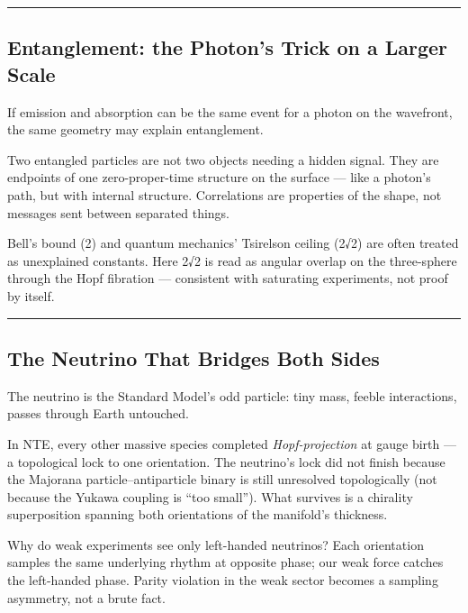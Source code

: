 \documentclass[
  11pt,
]{article}
\begin{document}
\begin{center}\rule{0.5\linewidth}{0.5pt}\end{center}

\subsection{Entanglement: the Photon's Trick on a Larger
Scale}\label{entanglement-the-photons-trick-on-a-larger-scale}

If emission and absorption can be the same event for a photon on the
wavefront, the same geometry may explain entanglement.

Two entangled particles are not two objects needing a hidden signal.
They are endpoints of one zero-proper-time structure on the surface ---
like a photon's path, but with internal structure. Correlations are
properties of the shape, not messages sent between separated things.

Bell's bound (2) and quantum mechanics' Tsirelson ceiling (2√2) are
often treated as unexplained constants. Here 2√2 is read as angular
overlap on the three-sphere through the Hopf fibration --- consistent
with saturating experiments, not proof by itself.

\begin{center}\rule{0.5\linewidth}{0.5pt}\end{center}

\subsection{The Neutrino That Bridges Both
Sides}\label{the-neutrino-that-bridges-both-sides}

The neutrino is the Standard Model's odd particle: tiny mass, feeble
interactions, passes through Earth untouched.

In NTE, every other massive species completed \emph{Hopf-projection} at
gauge birth --- a topological lock to one orientation. The neutrino's
lock did not finish because the Majorana particle--antiparticle binary
is still unresolved topologically (not because the Yukawa coupling is
``too small''). What survives is a chirality superposition spanning both
orientations of the manifold's thickness.

Why do weak experiments see only left-handed neutrinos? Each orientation
samples the same underlying rhythm at opposite phase; our weak force
catches the left-handed phase. Parity violation in the weak sector
becomes a sampling asymmetry, not a brute fact.
\end{document}
